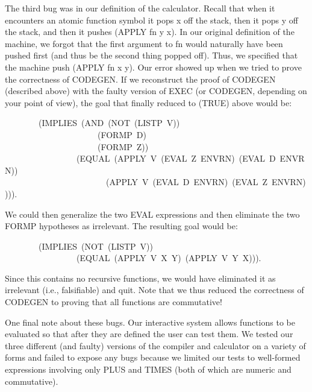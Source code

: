\documentclass[11pt]{book}
\newenvironment{pubasis}{\begin{flushleft}\ttfamily\small}{\normalsize\rmfamily\end{flushleft}}
\begin{document}
The third bug was in our definition of the calculator.  Recall that when
it encounters an atomic function symbol it pops x off the stack, then
it pops y off the stack, and then it pushes (APPLY fn y x).  In our
original definition of the machine, we forgot that the first argument
to fn would naturally have been pushed first (and thus be the second
thing popped off).  Thus, we specified that the machine push (APPLY fn x y).
Our error showed up when we tried to prove the correctness of CODEGEN.
If we reconstruct the proof of CODEGEN (described above) with the
faulty version of EXEC (or CODEGEN, depending on your point of view),
the goal that finally reduced to (TRUE) above would be:
\begin{pubasis}
~~~~~~~~(IMPLIES~(AND~(NOT~(LISTP~V))\\
~~~~~~~~~~~~~~~~~~~~~~(FORMP~D)\\
~~~~~~~~~~~~~~~~~~~~~~(FORMP~Z))\\
~~~~~~~~~~~~~~~~~(EQUAL~(APPLY~V~(EVAL~Z~ENVRN)~(EVAL~D~ENVRN))\\
~~~~~~~~~~~~~~~~~~~~~~~~(APPLY~V~(EVAL~D~ENVRN)~(EVAL~Z~ENVRN)))).\\
\end{pubasis}
We could then generalize the two EVAL expressions and then eliminate
the two FORMP hypotheses as irrelevant.  The resulting goal would
be:
\begin{pubasis}
~~~~~~~~(IMPLIES~(NOT~(LISTP~V))\\
~~~~~~~~~~~~~~~~~(EQUAL~(APPLY~V~X~Y)~(APPLY~V~Y~X))).\\
\end{pubasis}
Since this contains no recursive functions, we would have eliminated it
as irrelevant (i.e., falsifiable) and quit.  Note that we thus reduced
the correctness of CODEGEN to proving that all functions are
commutative!

One final note about these bugs.  Our interactive system allows
functions to be evaluated so that after they are defined the user
can test them.  We tested our three different (and faulty)
versions of the compiler and calculator on a variety of forms
and failed to expose any bugs because we limited our tests to
well-formed expressions involving only PLUS and TIMES (both of which
are numeric and commutative).
\end{document}
